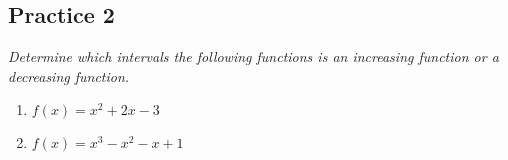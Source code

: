\subsection{Practice 2}

\noindent \hspace{1.2em}\textit{
    Determine which intervals the following functions is an increasing function or a decreasing function.
}
\begin{enumerate}
    \item $f(x)=x^2+2 x-3$
    \item $f(x)=x^3-x^2-x+1$
\end{enumerate}